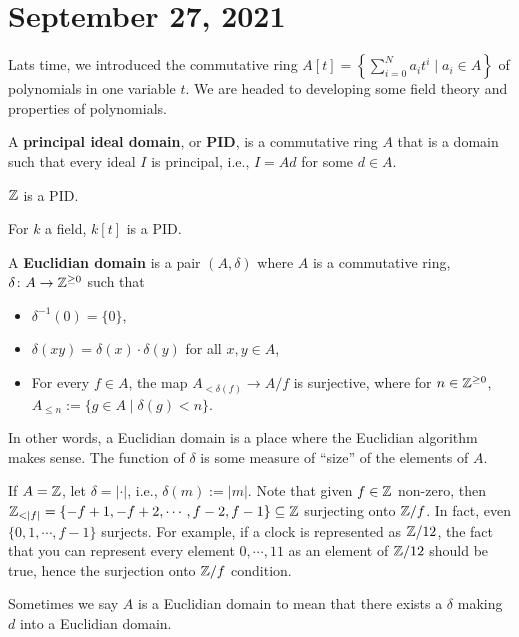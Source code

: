 \section{September 27, 2021} 
Lats time, we introduced the commutative ring $A[t]= \left\{ \sum_{i=0}^{N} a_i  t ^i  \mid  a _i  \in A \right\}  $ of polynomials in one variable $t$. We are headed to developing some field theory and properties of polynomials.

\begin{definition}[]
    A \textbf{principal ideal domain}, or \textbf{PID}, is a commutative ring $A$ that is a domain such that every ideal $I$ is principal, i.e., $I=A d$ for some $d \in  A$.
\end{definition}
\begin{example}
    $\mathbb{Z}$ is a PID.
\end{example}
\begin{prop}\label{polyfieldPID} 
    For $k$ a field, $k[t]$ is a PID.
\end{prop}
\begin{definition}[]
    A \textbf{Euclidian domain} is a pair $(A, \delta )$ where $A$ is a commutative ring, $\delta  \colon A \to \mathbb{Z}^{ \geq 0}$ such that
    \begin{itemize}
    \setlength\itemsep{-.2em}
\item $\delta ^{-1}(0) = \{ 0\} $,
\item $\delta (xy)= \delta (x) \cdot  \delta (y)$ for all $x,y \in A$,
\item For every $f \in A$, the map $A _{< \delta (f)}\to  A / f$ is surjective, where for $n \in \mathbb{Z} ^{ \geq 0}$, $A _{ \leq n}:= \{g \in A \mid  \delta (g) < n\} $.
    \end{itemize}
\end{definition}
    In other words, a Euclidian domain is a place where the Euclidian algorithm makes sense. The function of $\delta $ is some measure of ``size'' of the elements of $A$.
\begin{example}
    If $A = \mathbb{Z}$, let $\delta  = | \cdot |$, i.e., $\delta (m):= |m|$. Note that given $f \in \mathbb{Z}$ non-zero, then $\mathbb{Z} _{< | f |}= \{ -f+1,-f+2, \cdots ,f-2,f-1\}  \subseteq \mathbb{Z}$ surjecting onto $\mathbb{Z} /f$. In fact, even $\{0,1, \cdots ,f-1\} $ surjects. For example, if a clock is represented as $\mathbb{Z} /12$, the fact that you can represent every element $0, \cdots ,11$ as an element of $\mathbb{Z} /12$ should be true, hence the surjection onto $\mathbb{Z} /f$ condition.
\end{example}
\begin{remark}
    Sometimes we say $A$ is a Euclidian domain to mean that there exists a $\delta $ making $d$ into a Euclidian domain.
\end{remark}


